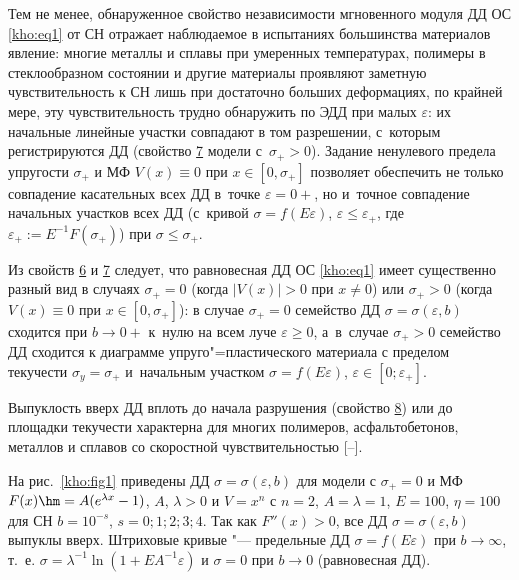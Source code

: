 Тем не менее, обнаруженное свойство независимости мгновенного модуля ДД ОС \eqref{kho:eq1} от СН отражает наблюдаемое в испытаниях большинства материалов явление: многие металлы и сплавы при умеренных температурах, полимеры в стеклообразном состоянии и другие материалы проявляют заметную чувствительность к СН лишь при достаточно больших деформациях, по крайней мере, эту чувствительность трудно обнаружить по ЭДД при малых $\varepsilon$: их начальные линейные участки совпадают в том разрешении, с~которым регистрируются ДД \cite{kho:bib9,kho:bib21,kho:bib22,kho:bib23,kho:bib24,kho:bib25} (свойство \hyperlink{kh:p7}{7} модели с~$\sigma_{+}>0$). Задание ненулевого предела упругости $\sigma_{+}$ и МФ $V(x)\equiv0$ при $x\in[0,\sigma_{+}]$ позволяет обеспечить не только совпадение касательных всех ДД в~точке $\varepsilon=0+$, но и~точное совпадение начальных участков всех ДД (с~кривой $\sigma=f(E\varepsilon)$, $\varepsilon\le\varepsilon_{+}$, где $\varepsilon_{+}:=E^{-1}F(\sigma_{+})$) при $\sigma\le\sigma_{+}$. 



Из свойств \hyperlink{kh:p6}{6} и \hyperlink{kh:p7}{7} следует, что равновесная ДД ОС \eqref{kho:eq1} имеет существенно разный вид в случаях $\sigma_{+}=0$ (когда $|V(x)|>0$ при $x\ne0$) или $\sigma_{+}>0$ (когда $V(x)\equiv0$ при $x\in[0,\sigma_{+}]$): в случае $\sigma_{+}=0$ семейство ДД $\sigma=\sigma(\varepsilon,b)$ сходится при $b\to0+$ к~нулю на всем луче $\varepsilon\ge0$, а~в~случае $\sigma_{+}>0$ семейство ДД сходится к диаграмме  упруго"=пластического материала с пределом текучести $\sigma_y=\sigma_{+}$ и~начальным участком $\sigma=f(E\varepsilon)$, $\varepsilon\in[0;\varepsilon_{+}]$. 



Выпуклость вверх ДД вплоть до начала разрушения (свойство \hyperlink{kh:p8}{8}) или до площадки текучести характерна для многих полимеров, асфальтобетонов, металлов и сплавов со скоростной чувствительностью [--].



На рис.~\ref{kho:fig1} приведены ДД $\sigma=\sigma(\varepsilon,b)$ для модели с $\sigma_{+}=0$ и МФ $F(x)\hm =A(e^{\lambda x}-1)$, $A$, $\lambda>0$ и $V=x^n$ с $n=2$, $A=\lambda=1$, $E=100$, $\eta=100$ для СН $b=10^{-s}$, $s=0; 1; 2; 3; 4$. Так как $F''(x)>0$,  все ДД $\sigma=\sigma(\varepsilon,b)$ выпуклы вверх. Штриховые кривые "--- предельные ДД $\sigma=f(E\varepsilon)$ при $b\to\infty$, т.~е. $\sigma=\lambda^{-1}\ln(1+EA^{-1}\varepsilon)$ и $\sigma=0$ при $b\to0$ (равновесная ДД). 



